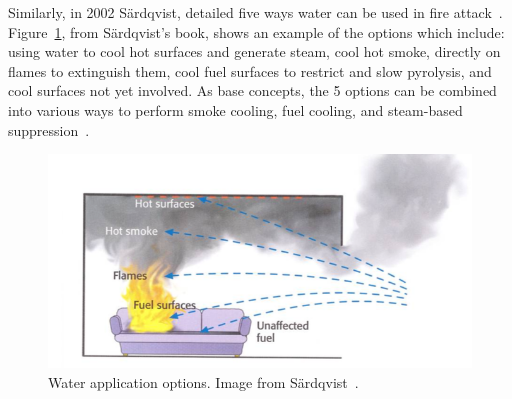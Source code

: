\documentclass[12pt,oneside]{book}
\begin{document}
Similarly, in 2002 S{\"a}rdqvist, detailed five ways water can be used in fire attack~\cite{sardqvist:2002}. Figure~\ref{fig:Water_Application}, from S{\"a}rdqvist's book, shows an example of the options which include: using water to cool hot surfaces and generate steam, cool hot smoke, directly on flames to extinguish them, cool fuel surfaces to restrict and slow pyrolysis, and cool surfaces not yet involved. As base concepts, the 5 options can be combined into various ways to perform smoke cooling, fuel cooling, and steam-based suppression~\cite{sardqvist:2002}.

\begin{figure}[!ht]
	\centering
	\includegraphics[width=.8\columnwidth]{Figures/Water_Distribution/water_application}
	\caption[Water Application Options]{Water application options. Image from S{\"a}rdqvist~\cite{sardqvist:2002}.}
	\label{fig:Water_Application}
\end{figure}
\end{document}
